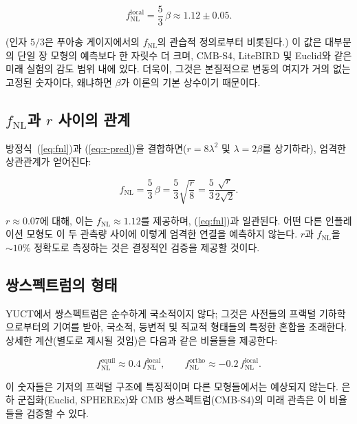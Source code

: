 \documentclass[11pt,a4paper]{article}
\begin{document}
	\begin{equation}
		f_{\text{NL}}^{\text{local}} = \frac{5}{3}\,\beta \approx 1.12 \pm 0.05.
		\label{eq:fnl}
	\end{equation}
	
	(인자 \(5/3\)은 푸아송 게이지에서의 \(f_{\text{NL}}\)의 관습적 정의로부터 비롯된다.) 이 값은 대부분의 단일 장 모형의 예측보다 한 자릿수 더 크며, CMB‑S4, LiteBIRD 및 Euclid와 같은 미래 실험의 감도 범위 내에 있다. 더욱이, 그것은 본질적으로 변동의 여지가 거의 없는 고정된 숫자이다, 왜냐하면 \(\beta\)가 이론의 기본 상수이기 때문이다.
	
	\subsection{\(f_{\text{NL}}\)과 \(r\) 사이의 관계}
	
	방정식~(\ref{eq:fnl})과 (\ref{eq:r-pred})을 결합하면(\(r = 8\lambda^2\) 및 \(\lambda = 2\beta\)를 상기하라), 엄격한 상관관계가 얻어진다:
	
	\begin{equation}
		f_{\text{NL}} = \frac{5}{3}\,\beta = \frac{5}{3}\sqrt{\frac{r}{8}} = \frac{5}{3}\frac{\sqrt{r}}{2\sqrt{2}}.
		\label{eq:fnl-r}
	\end{equation}
	
	\(r \approx 0.07\)에 대해, 이는 \(f_{\text{NL}} \approx 1.12\)를 제공하며, (\ref{eq:fnl})과 일관된다. 어떤 다른 인플레이션 모형도 이 두 관측량 사이에 이렇게 엄격한 연결을 예측하지 않는다. \(r\)과 \(f_{\text{NL}}\)을 \(\sim 10\%\) 정확도로 측정하는 것은 결정적인 검증을 제공할 것이다.
	
	\subsection{쌍스펙트럼의 형태}
	
	YUCT에서 쌍스펙트럼은 순수하게 국소적이지 않다; 그것은 사전들의 프랙털 기하학으로부터의 기여를 받아, 국소적, 등변적 및 직교적 형태들의 특정한 혼합을 초래한다. 상세한 계산(별도로 제시될 것임)은 다음과 같은 비율들을 제공한다:
	
	\begin{equation}
		f_{\text{NL}}^{\text{equil}} \approx 0.4\, f_{\text{NL}}^{\text{local}}, \qquad
		f_{\text{NL}}^{\text{ortho}} \approx -0.2\, f_{\text{NL}}^{\text{local}}.
		\label{eq:fnl-shapes}
	\end{equation}
	
	이 숫자들은 기저의 프랙털 구조에 특징적이며 다른 모형들에서는 예상되지 않는다. 은하 군집화(Euclid, SPHEREx)와 CMB 쌍스펙트럼(CMB‑S4)의 미래 관측은 이 비율들을 검증할 수 있다.
	
\end{document}
